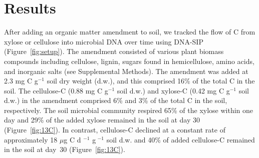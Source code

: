 \section{Results}
After adding an organic matter amendment to soil, we tracked the flow of C from
xylose or cellulose into microbial DNA over time using DNA-SIP
(Figure~\ref{fig:setup}). The amendment consisted of various plant biomass
compounds including cellulose, lignin, sugars found in hemicellulose, amino
acids, and inorganic salts (see Supplemental Methods). The amendment was added
at 2.3 mg C g$^{-1}$ soil dry weight (d.w.), and this comprised 16\% of the
total C in the soil. The cellulose-C (0.88 mg C g$^{-1}$ soil d.w.) and
xylose-C (0.42 mg C g$^{-1}$ soil d.w.) in the amendment comprised 6\% and 3\%
of the total C in the soil, respectively. The soil microbial community respired
65\% of the xylose within one day  and 29\% of the
added xylose remained in the soil at day 30 (Figure~\ref{fig:13C}). In
contrast, cellulose-C declined at a constant rate of approximately 18 $\mu$g
C d $^{-1}$ g $^{-1}$ soil d.w. and 40\% of added cellulose-C remained in the
soil at day~30 (Figure~\ref{fig:13C}).

